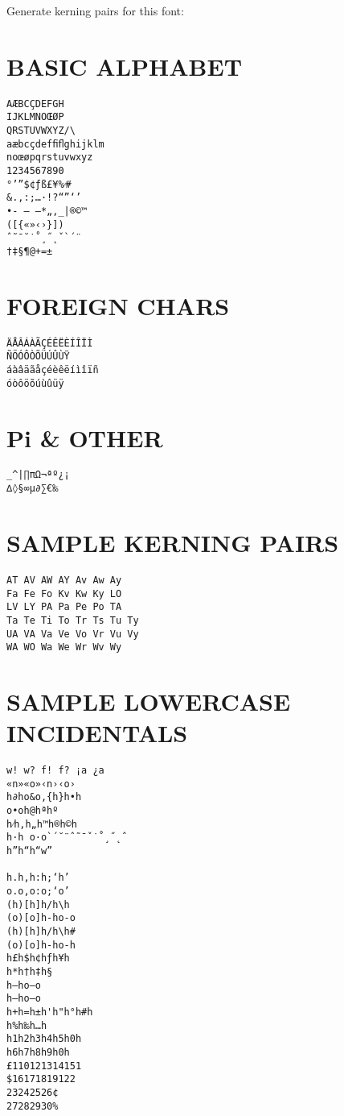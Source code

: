 \documentclass{article}
\newlength{\glyphwd}
\newcommand{\showglyph}[1]{%
  \begingroup
  \settowidth\glyphwd{#1}%
  \setlength{\fboxrule}{0.1pt}%
  \setlength{\fboxsep}{-0.05pt}%
  \makebox[0pt][l]{\vrule height 0.05pt depth 0.05pt width \glyphwd}%
  \fbox{#1}%
  \endgroup
}
\begin{document}
Generate kerning pairs for this font:
\section{BASIC ALPHABET}
\begin{verbatim}
AÆBCÇDEFGH
IJKLMNOŒØP
QRSTUVWXYZ/\
aæbcçdefﬁﬂghijklm
noœøpqrstuvwxyz
1234567890
°’”$¢ƒß£¥%⁄#
&.,:;…·!?“”‘’
•- – —*„‚_|®©™
([{«»‹›}])
ˆ˜¯˘˙˚¸˝˛ˇ`´¨
†‡§¶@+=±
\end{verbatim}

\section{FOREIGN CHARS}
\begin{verbatim}
ÄÅÂÁÀÃÇÉÊËÈÍÎÏÌ
ÑÖÓÔÒÕÜÚÛÙŸ
áàâäãåçéèêëíìîïñ
óòôöõúùûüÿ
\end{verbatim}

\section{Pi \& OTHER}

\begin{verbatim}
_^|∏πΩ¬ªº¿¡
∆◊§∞µ∂∑€‰
\end{verbatim}

\section{SAMPLE KERNING PAIRS}
\begin{verbatim}
AT AV AW AY Av Aw Ay
Fa Fe Fo Kv Kw Ky LO
LV LY PA Pa Pe Po TA
Ta Te Ti To Tr Ts Tu Ty
UA VA Va Ve Vo Vr Vu Vy
WA WO Wa We Wr Wv Wy
\end{verbatim}

\section{SAMPLE LOWERCASE INCIDENTALS}
\begin{verbatim}
w! w? f! f? ¡a ¿a
«n»«o»‹n›‹o›
h∂ho&o‚{h}h•h
o•oh@hªhº
h⁄h‚h„h™h®h©h
h·h o·o`´˘¨ˆ˜¯ˇ˙˚¸˝˛ˆ
h”h“h“w”

h.h,h:h;‘h’
o.o,o:o;‘o’
(h)[h]h/h\h
(o)[o]h-ho-o
(h)[h]h/h\h#
(o)[o]h-ho-h
h£h$h¢hƒh¥h
h*h†h‡h§
h–ho–o
h—ho—o
h+h=h±h'h"h°h#h
h%h‰h…h
h1h2h3h4h5h0h
h6h7h8h9h0h
£110121314151
$16171819122
23242526¢
27282930%
\end{verbatim}
\end{document}
